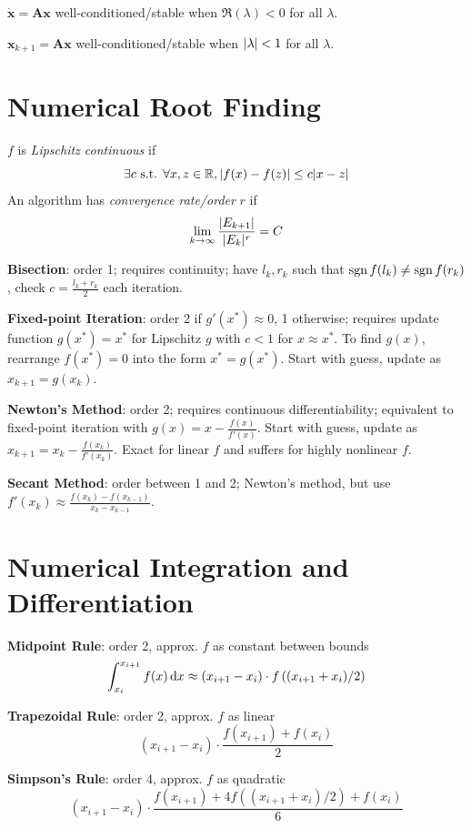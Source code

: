 \documentclass[twocolumn]{article}
\begin{document}
$\dot{\bm x} = \bm A\bm x$ well-conditioned/stable when $\Re(\lambda) < 0$ for all $\lambda$.

$\bm x_{k + 1} = \bm A\bm x$ well-conditioned/stable when $\lvert\lambda\rvert < 1$ for all $\lambda$.

\section{Numerical Root Finding}

$f$ is \textit{Lipschitz continuous} if
$$\exists c\text{ s.t. }\forall x, z \in \mathbb{R}, \lvert f(x) - f(z)\rvert \leq c\lvert x - z\rvert$$
An algorithm has \textit{convergence rate/order} $r$ if
$$\lim _{k \to \infty} \frac{\lvert E_{k + 1}\rvert}{\lvert E_k\rvert^r} = C$$

\textbf{Bisection}: order 1; requires continuity; have $l_k, r_k$ such that $\operatorname{sgn} f(l_k) \neq \operatorname{sgn} f(r_k)$, check $c = \frac{l_k + r_k}{2}$ each iteration.

\textbf{Fixed-point Iteration}: order 2 if $g'(x^*) \approx 0$, 1 otherwise; requires update function $g(x^*) = x^*$ for Lipschitz $g$ with $c < 1$ for $x \approx x^*$.
To find $g(x)$, rearrange $f(x^*) = 0$ into the form $x^* = g(x^*)$. Start with guess, update as $x_{k + 1} = g(x_k)$.

\textbf{Newton's Method}: order 2; requires continuous differentiability; equivalent to fixed-point iteration with $g(x) = x - \frac{f(x)}{f'(x)}$.
Start with guess, update as $x_{k + 1} = x_k - \frac{f(x_k)}{f'(x_k)}$. Exact for linear $f$ and suffers for highly nonlinear $f$.

\textbf{Secant Method}: order between 1 and 2; Newton's method, but use $f'(x_k) \approx \frac{f(x_k) - f(x_{k - 1})}{x_k - x_{k - 1}}$.

\section{Numerical Integration and Differentiation}

\textbf{Midpoint Rule}: order 2, approx. $f$ as constant between bounds
$$\int _{x_i}^{x_{i + 1}} f(x)\,\mathrm{d}x \approx (x_{i + 1} - x_i) \cdot f\left((x_{i + 1} + x_i)/2\right)$$

\textbf{Trapezoidal Rule}: order 2, approx. $f$ as linear
$$(x_{i + 1} - x_i) \cdot \frac{f(x_{i + 1}) + f(x_i)}{2}$$

\textbf{Simpson's Rule}: order 4, approx. $f$ as quadratic
$$(x_{i + 1} - x_i) \cdot \frac{f(x_{i + 1}) + 4f\left((x_{i + 1} + x_i)/2\right) + f(x_i)}{6}$$
\end{document}
